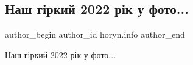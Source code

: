  
 
 
 
 

\subsection{Наш гіркий 2022 рік у фото...}
\label{sec:05_01_2023.fb.horyn.info.1.nash_g_rkii_2022_r_k}

\ifcmt
 author_begin
   author_id horyn.info
 author_end
\fi

Наш гіркий 2022 рік у фото...

